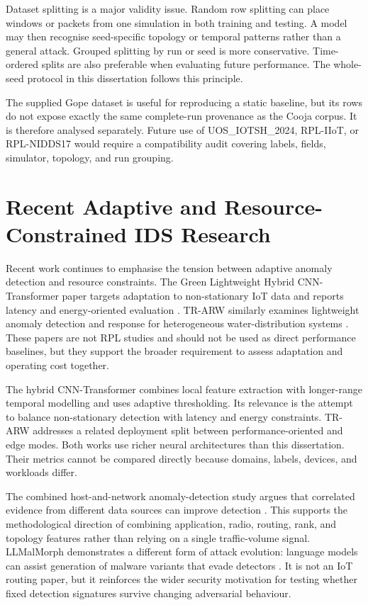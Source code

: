 Dataset splitting is a major validity issue. Random row splitting can place windows or packets from one simulation in both training and testing. A model may then recognise seed-specific topology or temporal patterns rather than a general attack. Grouped splitting by run or seed is more conservative. Time-ordered splits are also preferable when evaluating future performance. The whole-seed protocol in this dissertation follows this principle.

The supplied Gope dataset is useful for reproducing a static baseline, but its rows do not expose exactly the same complete-run provenance as the Cooja corpus. It is therefore analysed separately. Future use of UOS\_IOTSH\_2024, RPL-IIoT, or RPL-NIDDS17 would require a compatibility audit covering labels, fields, simulator, topology, and run grouping.

\section{Recent Adaptive and Resource-Constrained IDS Research}

Recent work continues to emphasise the tension between adaptive anomaly detection and resource constraints. The Green Lightweight Hybrid CNN-Transformer paper targets adaptation to non-stationary IoT data and reports latency and energy-oriented evaluation \cite{greenadaptive2026}. TR-ARW similarly examines lightweight anomaly detection and response for heterogeneous water-distribution systems \cite{trarw2026}. These papers are not RPL studies and should not be used as direct performance baselines, but they support the broader requirement to assess adaptation and operating cost together.

The hybrid CNN-Transformer combines local feature extraction with longer-range temporal modelling and uses adaptive thresholding. Its relevance is the attempt to balance non-stationary detection with latency and energy constraints. TR-ARW addresses a related deployment split between performance-oriented and edge modes. Both works use richer neural architectures than this dissertation. Their metrics cannot be compared directly because domains, labels, devices, and workloads differ.

The combined host-and-network anomaly-detection study argues that correlated evidence from different data sources can improve detection \cite{combinedids2026}. This supports the methodological direction of combining application, radio, routing, rank, and topology features rather than relying on a single traffic-volume signal. LLMalMorph demonstrates a different form of attack evolution: language models can assist generation of malware variants that evade detectors \cite{llmalmorph2025}. It is not an IoT routing paper, but it reinforces the wider security motivation for testing whether fixed detection signatures survive changing adversarial behaviour.

